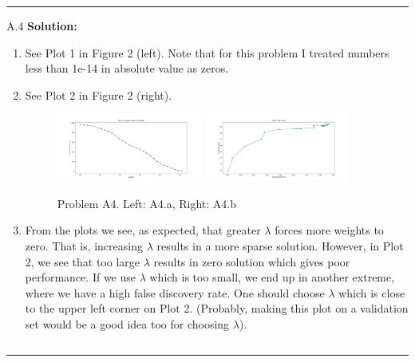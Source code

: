 \documentclass{article}
\newcommand{\1}{\mathbf{1}}
\begin{document}
\noindent\rule{\textwidth}{1pt}
A.4 {\bf Solution:}\\
\begin{enumerate}
    \item See Plot 1 in Figure 2 (left). Note that for this problem I treated numbers less than 1e-14 in absolute value as zeros.
    \item See Plot 2 in Figure 2 (right). 
        \begin{figure}[h!]
            \centering
            \includegraphics[width=0.45\textwidth]{hw2/code/figures/A4a.pdf}
            \includegraphics[width=0.45\textwidth]{hw2/code/figures/A4b.pdf}
            \caption{Problem A4. Left: A4.a, Right: A4.b}
            \label{figure:a4}
        \end{figure}
    \item From the plots we see, as expected, that greater $\lambda$ forces more weights to zero. That is, increasing $\lambda$ results in a more sparse solution. However, in Plot 2, we see that too large $\lambda$ results in zero solution which gives poor performance. If we use $\lambda$ which is too small, we end up in another extreme, where we have a high false discovery rate. One should choose $\lambda$ which is close to the upper left corner on Plot 2. (Probably, making this plot on a validation set would be a good idea too for choosing $\lambda$).
\end{enumerate}
\inputminted{python}{code/A4.py}
\caption{Code for A4}
\noindent\rule{\textwidth}{1pt}
\end{document}

